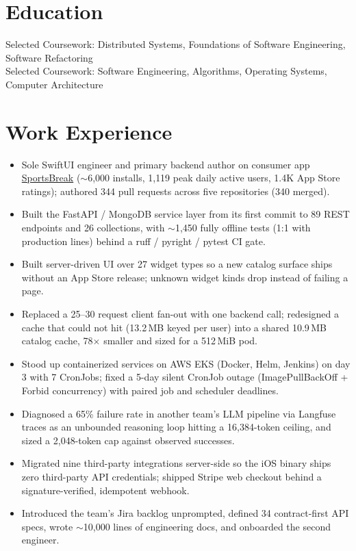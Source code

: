 \documentclass[11pt, letterpaper]{article}
\begin{document}

\section{Education}
Selected Coursework: Distributed Systems, Foundations of Software Engineering, Software Refactoring\\[1pt]
Selected Coursework: Software Engineering, Algorithms, Operating Systems, Computer Architecture

\section{Work Experience}
\begin{itemize}
  \item Sole SwiftUI engineer and primary backend author on consumer app \href{https://apps.apple.com/app/id6762649287}{SportsBreak} ($\sim$6{,}000 installs, 1{,}119 peak daily active users, 1.4K App Store ratings); authored 344 pull requests across five repositories (340 merged).
  \item Built the FastAPI / MongoDB service layer from its first commit to 89 REST endpoints and 26 collections, with $\sim$1{,}450 fully offline tests (1:1 with production lines) behind a ruff / pyright / pytest CI gate.
  \item Built server-driven UI over 27 widget types so a new catalog surface ships without an App Store release; unknown widget kinds drop instead of failing a page.
  \item Replaced a 25--30 request client fan-out with one backend call; redesigned a cache that could not hit (13.2\,MB keyed per user) into a shared 10.9\,MB catalog cache, 78$\times$ smaller and sized for a 512\,MiB pod.
  \item Stood up containerized services on AWS EKS (Docker, Helm, Jenkins) on day 3 with 7 CronJobs; fixed a 5-day silent CronJob outage (ImagePullBackOff + Forbid concurrency) with paired job and scheduler deadlines.
  \item Diagnosed a 65\% failure rate in another team's LLM pipeline via Langfuse traces as an unbounded reasoning loop hitting a 16{,}384-token ceiling, and sized a 2{,}048-token cap against observed successes.
  \item Migrated nine third-party integrations server-side so the iOS binary ships zero third-party API credentials; shipped Stripe web checkout behind a signature-verified, idempotent webhook.
  \item Introduced the team's Jira backlog unprompted, defined 34 contract-first API specs, wrote $\sim$10{,}000 lines of engineering docs, and onboarded the second engineer.
\end{itemize}
\end{document}
